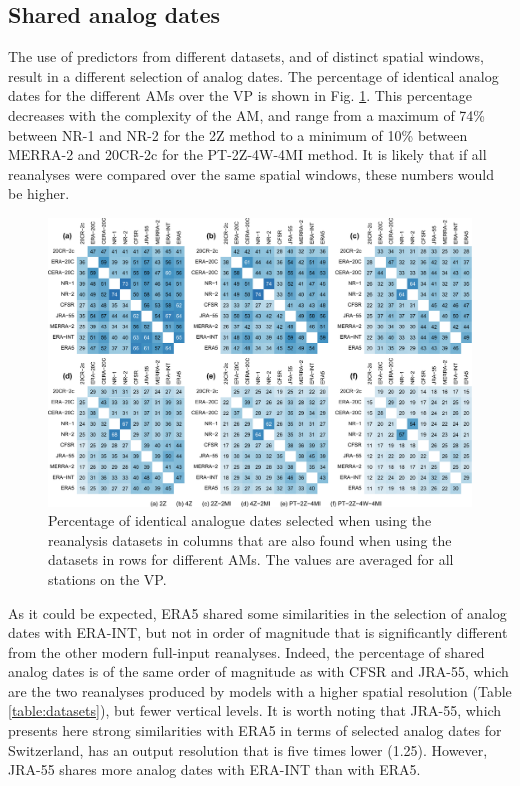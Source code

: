 \documentclass[alpha-refs]{wiley-article}
\begin{document}
\subsection{Shared analog dates}
\label{sec:results_shared_dates}

The use of predictors from different datasets, and of distinct spatial windows, result in a different selection of analog dates. The percentage of identical analog dates for the different AMs over the VP is shown in Fig. \ref{fig:shared-dates}. This percentage decreases with the complexity of the AM, and range from a maximum of 74\% between NR-1 and NR-2 for the 2Z method to a minimum of 10\% between MERRA-2 and 20CR-2c for the PT-2Z-4W-4MI method. It is likely that if all reanalyses were compared over the same spatial windows, these numbers would be higher.

\begin{figure}[bt]
	\centering
	\includegraphics[width=120mm]{figures/similar-dates.pdf}
	\caption{Percentage of identical analogue dates selected when using the reanalysis datasets in columns that are also found when using the datasets in rows for different AMs. The values are averaged for all stations on the VP.}
	\label{fig:shared-dates}
\end{figure}

As it could be expected, ERA5 shared some similarities in the selection of analog dates with ERA-INT, but not in order of magnitude that is significantly different from the other modern full-input reanalyses. Indeed, the percentage of shared analog dates is of the same order of magnitude as with CFSR and JRA-55, which are the two reanalyses produced by models with a higher spatial resolution (Table \ref{table:datasets}), but fewer vertical levels. It is worth noting that JRA-55, which presents here strong similarities with ERA5 in terms of selected analog dates for Switzerland, has an output resolution that is five times lower (1.25\degree). However, JRA-55 shares more analog dates with ERA-INT than with ERA5. 
\end{document}
